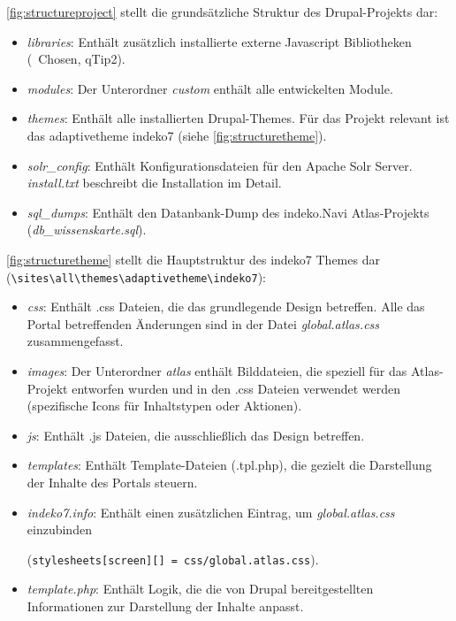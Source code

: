 \cref{fig:structureproject} stellt die grundsätzliche Struktur des Drupal-Projekts dar:
\begin{itemize}
	\item \textit{libraries}: Enthält zusätzlich installierte externe Javascript Bibliotheken (\zB\ Chosen, qTip2).

	\item \textit{modules}: Der Unterordner \textit{custom} enthält alle entwickelten Module.

	\item \textit{themes}: Enthält alle installierten Drupal-Themes. Für das Projekt relevant ist das adaptivetheme indeko7 (siehe \cref{fig:structuretheme}).

	\item \textit{solr\_config}: Enthält Konfigurationsdateien für den Apache Solr Server. \textit{install.txt} beschreibt die Installation im Detail.

	\item \textit{sql\_dumps}: Enthält den Datanbank-Dump des \acrshort{indeko}.Navi Atlas-Projekts  (\textit{db\_wissenskarte.sql}).
\end{itemize}



\cref{fig:structuretheme} stellt die Hauptstruktur des indeko7 Themes dar (\lstinline|\sites\all\themes\adaptivetheme\indeko7|):
\begin{itemize}
	\item \textit{css}: Enthält .css Dateien, die das grundlegende Design betreffen. Alle das Portal betreffenden Änderungen sind in der Datei \textit{global.atlas.css} zusammengefasst.

	\item \textit{images}: Der Unterordner \textit{atlas} enthält Bilddateien, die speziell für das Atlas-Projekt entworfen wurden und in den .css Dateien verwendet werden (\zB spezifische Icons für Inhaltstypen oder Aktionen).

	\item \textit{js}: Enthält .js Dateien, die ausschließlich das Design betreffen.

	\item \textit{templates}: Enthält Template-Dateien (.tpl.php), die gezielt die Darstellung der Inhalte des Portals steuern.

	\item \textit{indeko7.info}: Enthält einen zusätzlichen Eintrag, um \textit{global.atlas.css} einzubinden

	(\lstinline|stylesheets[screen][] = css/global.atlas.css|).

	\item \textit{template.php}: Enthält Logik, die die von Drupal bereitgestellten Informationen zur Darstellung der Inhalte anpasst.

\end{itemize}



